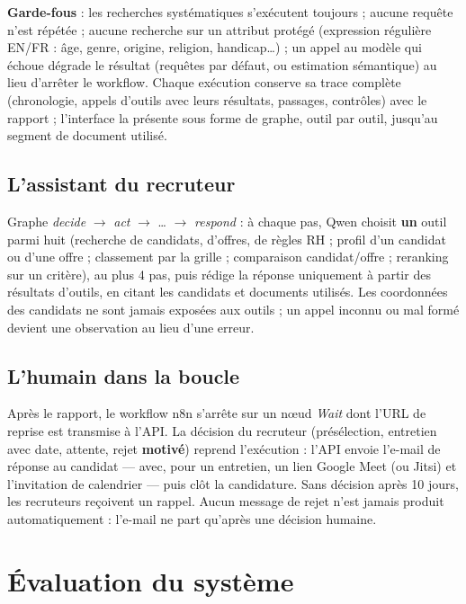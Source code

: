 \documentclass[11pt,a4paper]{report}
\begin{document}
\textbf{Garde-fous} : les recherches systématiques s'exécutent toujours ; aucune requête n'est répétée ; aucune recherche sur un attribut protégé (expression régulière EN/FR : âge, genre, origine, religion, handicap\ldots) ; un appel au modèle qui échoue dégrade le résultat (requêtes par défaut, ou estimation sémantique) au lieu d'arrêter le workflow. Chaque exécution conserve sa trace complète (chronologie, appels d'outils avec leurs résultats, passages, contrôles) avec le rapport ; l'interface la présente sous forme de graphe, outil par outil, jusqu'au segment de document utilisé.

\section{L'assistant du recruteur}

Graphe \emph{decide} $\rightarrow$ \emph{act} $\rightarrow$ \ldots{} $\rightarrow$ \emph{respond} : à chaque pas, Qwen choisit \textbf{un} outil parmi huit (recherche de candidats, d'offres, de règles RH ; profil d'un candidat ou d'une offre ; classement par la grille ; comparaison candidat/offre ; reranking sur un critère), au plus 4 pas, puis rédige la réponse uniquement à partir des résultats d'outils, en citant les candidats et documents utilisés. Les coordonnées des candidats ne sont jamais exposées aux outils ; un appel inconnu ou mal formé devient une observation au lieu d'une erreur.

\section{L'humain dans la boucle}

Après le rapport, le workflow n8n s'arrête sur un nœud \emph{Wait} dont l'URL de reprise est transmise à l'API. La décision du recruteur (présélection, entretien avec date, attente, rejet \textbf{motivé}) reprend l'exécution : l'API envoie l'e-mail de réponse au candidat --- avec, pour un entretien, un lien Google Meet (ou Jitsi) et l'invitation de calendrier --- puis clôt la candidature. Sans décision après 10 jours, les recruteurs reçoivent un rappel. Aucun message de rejet n'est jamais produit automatiquement : l'e-mail ne part qu'après une décision humaine.

\chapter{Évaluation du système}
\end{document}
